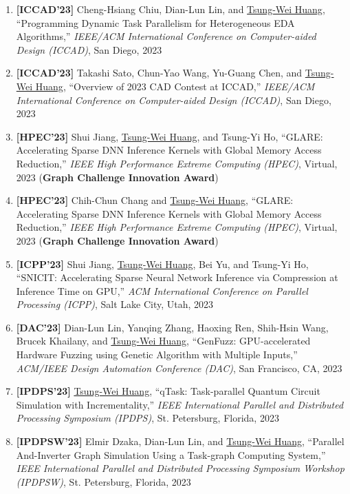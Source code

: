 \documentclass[A4,11pt]{article}
\begin{document}
\begin{enumerate}
    \item \textbf{[ICCAD'23]} Cheng-Hsiang Chiu, Dian-Lun Lin, and \underline{Tsung-Wei Huang}, ``Programming Dynamic Task Parallelism for Heterogeneous EDA Algorithms,'' \textit{IEEE/ACM International Conference on Computer-aided Design (ICCAD)}, San Diego, 2023
    
    \item \textbf{[ICCAD'23]} Takashi Sato, Chun-Yao Wang, Yu-Guang Chen, and \underline{Tsung-Wei Huang}, ``Overview of 2023 CAD Contest at ICCAD,'' \textit{IEEE/ACM International Conference on Computer-aided Design (ICCAD)}, San Diego, 2023
    
    \item \textbf{[HPEC'23]} Shui Jiang, \underline{Tsung-Wei Huang}, and Tsung-Yi Ho, ``GLARE: Accelerating Sparse DNN Inference Kernels with Global Memory Access Reduction,'' \textit{IEEE High Performance Extreme Computing (HPEC)}, Virtual, 2023 (\textbf{Graph Challenge Innovation Award})

    \item \textbf{[HPEC'23]} Chih-Chun Chang and \underline{Tsung-Wei Huang}, ``GLARE: Accelerating Sparse DNN Inference Kernels with Global Memory Access Reduction,'' \textit{IEEE High Performance Extreme Computing (HPEC)}, Virtual, 2023 (\textbf{Graph Challenge Innovation Award})

    \item \textbf{[ICPP'23]} Shui Jiang, \underline{Tsung-Wei Huang}, Bei Yu, and Tsung-Yi Ho, ``SNICIT: Accelerating Sparse Neural Network Inference via Compression at Inference Time on GPU,'' \textit{ACM International Conference on Parallel Processing (ICPP)}, Salt Lake City, Utah, 2023

    \item \textbf{[DAC'23]} Dian-Lun Lin, Yanqing Zhang, Haoxing Ren, Shih-Hsin Wang, Brucek Khailany, and \underline{Tsung-Wei Huang}, ``GenFuzz: GPU-accelerated Hardware Fuzzing using Genetic Algorithm with Multiple Inputs,'' \textit{ACM/IEEE Design Automation Conference (DAC)}, San Francisco, CA, 2023

    \item \textbf{[IPDPS'23]} \underline{Tsung-Wei Huang}, ``qTask: Task-parallel Quantum Circuit Simulation with Incrementality,'' \textit{IEEE International Parallel and Distributed Processing Symposium (IPDPS)}, St. Petersburg, Florida, 2023 

    \item \textbf{[IPDPSW'23]} Elmir Dzaka, Dian-Lun Lin, and \underline{Tsung-Wei Huang}, ``Parallel And-Inverter Graph Simulation Using a Task-graph Computing System,'' \textit{IEEE International Parallel and Distributed Processing Symposium Workshop (IPDPSW)}, St. Petersburg, Florida, 2023 


\end{enumerate}
\end{document}
